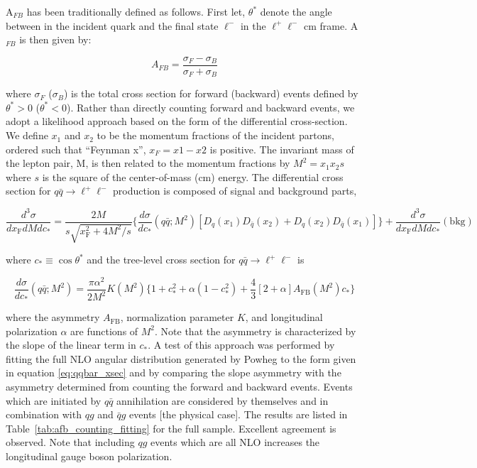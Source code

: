 \documentclass[
    10pt, %
    a4paper, %
    oneside, %
    headinclude,footinclude, %
    BCOR5mm, %
]{scrartcl}
\begin{document}
A$_{FB}$ has been traditionally defined as follows. First let, $\theta^{*}$ denote the angle between in the incident quark and the final state 
$\ell^-$ in the $\ell^+\ell^-$ cm frame. A$_{FB}$ is then given by:

\begin{equation}
    \label{eq:afb_def}
    A_{FB} = \frac{\sigma_F - \sigma_B}{\sigma_F + \sigma_B}
\end{equation}

where $\sigma_F$ ($\sigma_B$) is the total cross section for forward (backward) events defined by $\theta^* > 0$ ($\theta^* < 0$). 
Rather than directly counting forward and backward events, we adopt a likelihood approach based on the form of the differential cross-section. 
We define $x_1$ and $x_2$ to be the momentum fractions of the incident partons, ordered such that ``Feynman x'', $x_F = x1 - x2$ is positive. 
The invariant mass of the lepton pair, M, is then related to the momentum fractions by $M^2 = x_1 x_2 s$ where $s$ is the square of the center-of-mass (cm) energy. 
The differential cross section for $q\bar q\to\ell^+\ell^-$ production is composed of signal and background parts,

\begin{equation}
    \label{eq:tot_xsec}
    \frac{d^3\sigma}{dx_\mathrm{F}dMdc_*} =\frac{2M}{s\sqrt{x_\mathrm{F}^2+4M^2/s}}\biggl\lbrace\frac{d\sigma}{dc_*}(q\bar q;M^2)\left[D_q(x_1)D_{\bar q}(x_2)+D_q(x_2)D_{\bar q}(x_1)\right] 
    \biggr\rbrace + \frac{d^3\sigma}{dx_\mathrm{F}dMdc_*}(\mathrm{bkg})
\end{equation}

where $c_*\equiv\cos{\theta^*}$ and the tree-level cross section for $q\bar q \to \ell^+\ell^-$ is

\begin{equation}
    \label{eq:qqbar_xsec}
    \frac{d\sigma}{dc_*}(q\bar q;M^2) = \frac{\pi\alpha^2}{2M^2}K(M^2)\biggl\lbrace1+c_*^2+\alpha\left(1-c_*^2\right)
    +\frac{4}{3}\left[2+\alpha\right]A_\mathrm{FB}(M^2)c_*\biggr\rbrace
\end{equation}


where the asymmetry $A_\mathrm{FB}$, normalization parameter $K$, and longitudinal polarization $\alpha$ are functions of $M^2$.  
Note that the asymmetry is characterized by the slope of the linear term in $c_*$.  
A test of this approach was performed by fitting the full NLO angular distribution generated by Powheg to the form given in equation \ref{eq:qqbar_xsec} 
and by comparing the slope asymmetry with the asymmetry determined from counting the forward and backward events.  
Events which are initiated by $q\bar q$ annihilation are considered by themselves and in combination with $qg$ and $\bar q g$ events [the physical case].  
The results are listed in Table~\ref{tab:afb_counting_fitting} for the full sample.  Excellent agreement is observed.  
Note that including $qg$ events which are all NLO increases the longitudinal gauge boson polarization.
\end{document}
